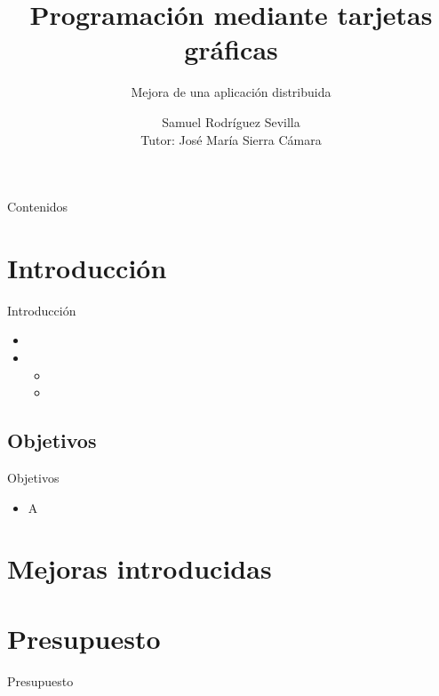 \documentclass[12pt]{beamer}
\begin{document}
\title{Programación mediante tarjetas gráficas}
\subtitle{Mejora de una aplicación distribuida}
\author{Samuel Rodríguez Sevilla\\Tutor: José María Sierra Cámara}


\frame{\titlepage}

\begin{frame}{Contenidos}
	\tableofcontents[pausesections]
\end{frame}

\section{Introducción}
\begin{frame}{Introducción}
	\begin{itemize}
		\item {}
		\item {}
		\begin{itemize}
			\item {}
			\item {}
		\end{itemize}
	\end{itemize}
\end{frame}

\subsection{Objetivos}
\begin{frame}{Objetivos}
	\begin{itemize}
		\item A
	\end{itemize}
\end{frame}


\section{Mejoras introducidas}

\subsection{}
\begin{frame}{}
	
\end{frame}
\section{Presupuesto}
\begin{frame}{Presupuesto}
\end{frame}
\end{document}
